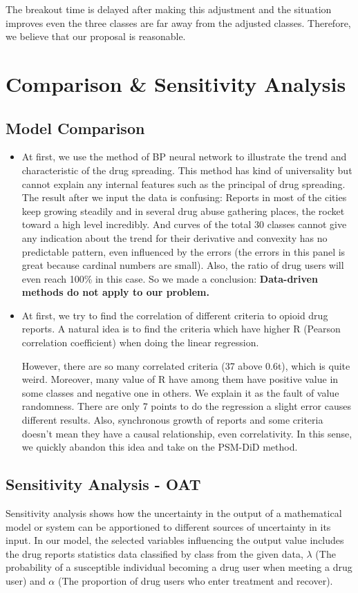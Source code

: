 \documentclass{mcmthesis}
\begin{document}
The breakout time is delayed after making this adjustment and the situation improves even the three classes are far away from the adjusted classes. Therefore, we believe that our proposal is reasonable.





\section{Comparison \& Sensitivity Analysis}
\subsection{Model Comparison}
\begin{itemize}
	\item At first, we use the method of BP neural network to illustrate the trend and characteristic of the drug spreading. This method has kind of universality but cannot explain any internal features such as the principal of drug spreading. The result after we input the data is confusing: Reports in most of the cities keep growing steadily and in several drug abuse gathering places, the rocket toward a high level incredibly. And curves of the total 30 classes cannot give any indication about the trend for their derivative and convexity has no predictable pattern, even influenced by the errors (the errors in this panel is great because cardinal numbers are small). Also, the ratio of drug users will even reach 100\% in this case. So we made a conclusion: \textbf{Data-driven methods do not apply to our problem.}
	\item At first, we try to find the correlation of different criteria to opioid drug reports. A natural idea is to find the criteria which have higher R (Pearson correlation coefficient) when doing the linear regression. 

However, there are so many correlated criteria (37 above 0.6t), which is quite weird. Moreover, many value of R have among them have positive value in some classes and negative one in others. We explain it as the fault of value randomness. There are only 7 points to do the regression a slight error causes different results. Also, synchronous growth of reports and some criteria doesn't mean they have a causal relationship, even correlativity. In this sense, we quickly abandon this idea and take on the PSM-DiD method.
	
\end{itemize}
\subsection{Sensitivity Analysis - OAT}
Sensitivity analysis shows how the uncertainty in the output of a mathematical model or system can be apportioned to different sources of uncertainty in its input. In our model, the selected variables influencing the output value includes the drug reports statistics data classified by class from the given data, $\lambda$ (The probability of a susceptible individual becoming a drug user when meeting a drug user) and $\alpha$ (The proportion of drug users who enter treatment and recover). 
\end{document}
